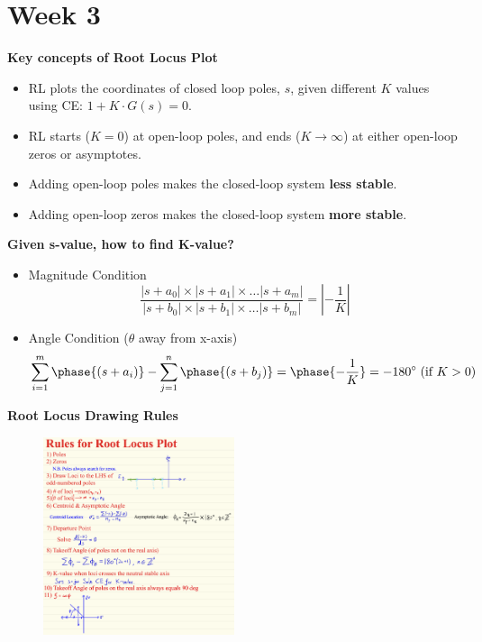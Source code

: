 \section{Week 3}
\textbf{Key concepts of Root Locus Plot}
\begin{itemize}
    \item RL plots the coordinates of closed loop poles, $s$, given different $K$ values using CE: $1+K\cdot G(s) = 0$.
    \item RL starts ($K=0$) at open-loop poles, and ends ($K\to \infty$) at either open-loop zeros or asymptotes. 
    \item Adding open-loop poles makes the closed-loop system \textbf{less stable}.
    \item Adding open-loop zeros makes the closed-loop system \textbf{more stable}. 
\end{itemize}

\textbf{Given s-value, how to find K-value?}
\begin{itemize}
    \item Magnitude Condition \\
    \begin{equation*}
        \frac{|s+a_0|\times |s+a_1| \times \ldots |s+a_m|}{|s+b_0|\times |s+b_1| \times \ldots |s+b_m|} = \left|-\frac{1}{K}\right|
    \end{equation*}
    \item Angle Condition ($\theta$ away from x-axis) \\
    \begin{equation*}
        \sum_{i=1}^{m} \phase{(s+a_i)} - \sum_{j=1}^{n}\phase{(s+b_j)} = \phase{-\frac{1}{K}} = -180^{\circ} \; (\text{if $K>0$})
    \end{equation*}
\end{itemize}

\textbf{Root Locus Drawing Rules}
\begin{figure}[H]
    \centering
    \includegraphics[width=0.5\textwidth]{images/root_locus_rules.png}
\end{figure}

\vspace{2cm}